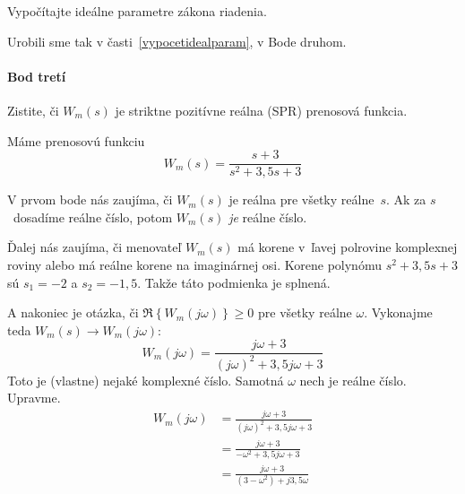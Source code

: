 \documentclass[a4paper, 10pt, ]{article}
\begin{document}
{\color{gray}

Vypočítajte ideálne parametre zákona riadenia.

}

\smallskip

\noindent
Urobili sme tak v časti~\ref{vypocetidealparam}, v Bode druhom.











\paragraph{Bod tretí}

\smallskip

{\color{gray}

Zistite, či $W_m(s)$ je striktne pozitívne reálna (SPR) prenosová funkcia.

}

\smallskip

\noindent
Máme prenosovú funkciu
\begin{equation}
    W_m(s) = \frac{s + 3}{ s^2 + 3,5 s + 3}
\end{equation}

V prvom bode nás zaujíma, či $W_m(s)$ je reálna pre všetky reálne~$s$. Ak za $s$~dosadíme reálne číslo, potom $W_m(s)$ \emph{je} reálne číslo.

Ďalej nás zaujíma, či menovateľ $W_m(s)$ má korene v~ľavej polrovine komplexnej roviny alebo má reálne korene na imaginárnej osi. Korene polynómu $s^2 + 3,5 s + 3$ sú $s_1 = -2$ a $s_2 = -1,5$. Takže táto podmienka je splnená.

A nakoniec je otázka, či $\Re \left\{ W_m(j\omega) \right\} \geq 0$ pre všetky reálne $\omega$. Vykonajme teda $W_m(s) \to W_m(j\omega)$:
\begin{equation}
    W_m(j\omega) = \frac{j\omega + 3}{ (j\omega)^2 + 3,5 j\omega + 3}
\end{equation}
Toto je (vlastne) nejaké komplexné číslo. Samotná $\omega$ nech je reálne číslo. Upravme.
\begin{subequations}
    \begin{align}
        W_m(j\omega) &= \frac{j\omega + 3}{ (j\omega)^2 + 3,5 j\omega + 3} \\
        &= \frac{j\omega + 3}{ -\omega^2 + 3,5 j\omega + 3} \\
        &= \frac{j\omega + 3}{ \left(3 - \omega^2\right) + j 3,5 \omega }
    \end{align}
\end{subequations}
\end{document}
